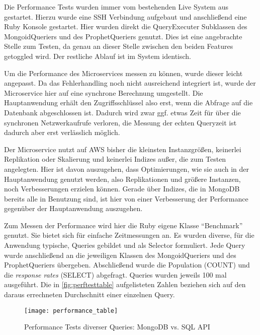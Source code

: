 Die Performance Tests wurden immer vom bestehenden Live System aus gestartet. Hierzu wurde eine SSH Verbindung aufgebaut und anschließend eine Ruby Konsole gestartet. Hier wurden direkt die QueryExecuter Subklassen des MongoidQueriers und des ProphetQueriers genutzt. Dies ist eine angebrachte Stelle zum Testen, da genau an dieser Stelle zwischen den beiden Features getoggled wird. Der restliche Ablauf ist im System identisch.

Um die Performance des Microservices messen zu können, wurde dieser leicht angepasst. Da das Fehlerhandling noch nicht ausreichend integriert ist, wurde der Microservice hier auf eine synchrone Berechnung umgestellt. Die Hauptanwendung erhält den Zugriffsschlüssel also erst, wenn die Abfrage auf die Datenbank abgeschlossen ist. Dadurch wird zwar ggf. etwas Zeit für über die synchronen Netzwerkaufrufe verloren, die Messung der echten Queryzeit ist dadurch aber erst verlässlich möglich.

Der Microservice nutzt auf AWS bisher die kleinsten Instanzgrößen, keinerlei Replikation oder Skalierung und keinerlei Indizes außer, die zum Testen angelegten. 
Hier ist davon auszugehen, dass Optimierungen, wie sie auch in der Hauptanwendung genutzt werden, also Replikationen und größere Instanzen, noch Verbesserungen erzielen können. Gerade über Indizes, die in MongoDB bereits alle in Benutzung sind, ist hier von einer Verbesserung der Performance gegenüber der Hauptanwendung auszugehen.

Zum Messen der Performance wird hier die Ruby eigene Klasse ``Benchmark'' genutzt. Sie bietet sich für einfache Zeitmessungen an. 
Es wurden diverse, für die Anwendung typische, Queries gebildet und als Selector formuliert. Jede Query wurde anschließend an die jeweiligen Klassen des MongoidQueriers und des ProphetQueriers übergeben. Abschließend wurde die Population (COUNT) und die \textit{response rates} (SELECT) abgefragt. Queries wurden jeweils 100 mal ausgeführt. Die in \autoref{fig:perftesttable} aufgelisteten Zahlen beziehen sich auf den daraus errechneten Durchschnitt einer einzelnen Query.

\begin{figure}[!ht]
    \centering
    \caption{Performance Tests diverser Queries: MongoDB vs. SQL API}
    \label{fig:perftesttable}
    \texttt{[image: performance\_table]}
\end{figure}

